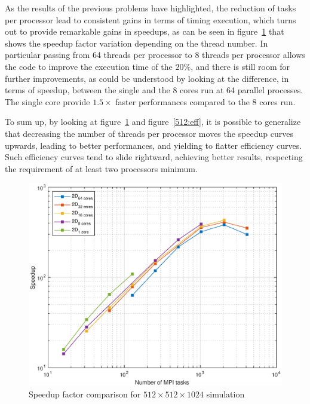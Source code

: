 \par
As the results of the previous problems have highlighted, the reduction of tasks per processor lead to consistent gains in terms of timing execution, which turns out to provide remarkable gains in speedups, as can be seen in figure~\ref{512:perf} that shows the speedup factor variation depending on the thread number. In particular passing from 64 threads per processor to 8 threads per processor allows the code to improve the execution time of the $20\%$, and there is still room for further improvements, as could be understood by looking at the difference, in terms of speedup, between the single and the 8 cores run at 64 parallel processes. The single core provide $1.5\times$ faster performances compared to the 8 cores run. \\
\par
To sum up, by looking at figure~\ref{512:perf} and figure~\ref{512:eff}, it is possible to generalize that decreasing the number of threads per processor moves the speedup curves upwards, leading to better performances, and yielding to flatter efficiency curves. Such efficiency curves tend to slide rightward, achieving better results, respecting the requirement of at least two processors minimum. 


\begin{figure}
\begin{center}
\includegraphics[scale=0.55]{grafici/5125}
\caption{Speedup factor comparison for $512\times 512\times 1024$ simulation}
\label{512:perf}
\end{center}
\end{figure}

